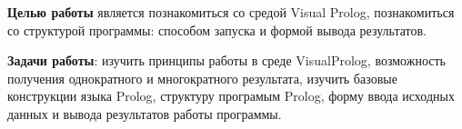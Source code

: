\Introduction

\textbf{Целью работы} является познакомиться со средой Visual Prolog, познакомиться со структурой программы: способом запуска и формой вывода результатов.

\textbf{Задачи работы}: изучить принципы работы в среде VisualProlog, возможность получения однократного и многократного результата, изучить базовые конструкции языка Prolog, структуру програмым Prolog, форму ввода исходных данных и вывода результатов работы программы.

